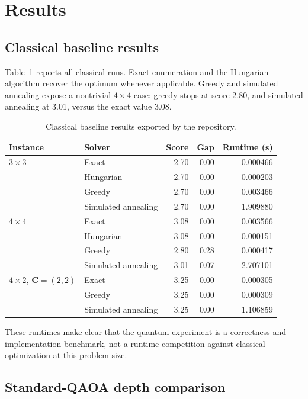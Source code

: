 \section{Results}

\subsection{Classical baseline results}

Table~\ref{tab:classical_results} reports all classical runs. Exact enumeration and the Hungarian algorithm recover the optimum whenever applicable. Greedy and simulated annealing expose a nontrivial $4\times4$ case: greedy stops at score 2.80, and simulated annealing at 3.01, versus the exact value 3.08.

\begin{table}[H]
\centering
\caption{Classical baseline results exported by the repository.}
\label{tab:classical_results}
\small
\begin{tabular}{llrrr}
\toprule
Instance & Solver & Score & Gap & Runtime (s)\\
\midrule
$3\times3$ & Exact & 2.70 & 0.00 & 0.000466\\
 & Hungarian & 2.70 & 0.00 & 0.000203\\
 & Greedy & 2.70 & 0.00 & 0.003466\\
 & Simulated annealing & 2.70 & 0.00 & 1.909880\\
\midrule
$4\times4$ & Exact & 3.08 & 0.00 & 0.003566\\
 & Hungarian & 3.08 & 0.00 & 0.000151\\
 & Greedy & 2.80 & 0.28 & 0.000417\\
 & Simulated annealing & 3.01 & 0.07 & 2.707101\\
\midrule
$4\times2$, $\bm C=(2,2)$ & Exact & 3.25 & 0.00 & 0.000305\\
 & Greedy & 3.25 & 0.00 & 0.000309\\
 & Simulated annealing & 3.25 & 0.00 & 1.106859\\
\bottomrule
\end{tabular}
\end{table}

These runtimes make clear that the quantum experiment is a correctness and \NISQ{} implementation benchmark, not a runtime competition against classical optimization at this problem size.

\subsection{Standard-QAOA depth comparison}


